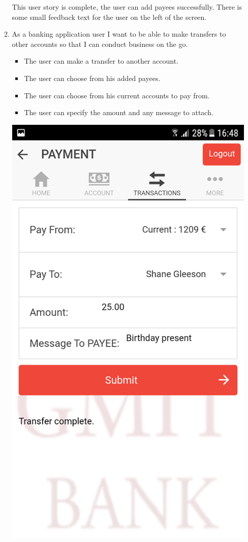 \begin{itemize}
\begin{enumerate}
\begin{center}
\end{center}
        This user story is complete, the user can add payees successfully. There is some small feedback text for the user on the left of the screen.
        \item As a banking application user I want to be able to make transfers to other accounts so that I can conduct business on the go.
            \begin{itemize}
                \item The user can make a transfer to another account.
                \item The user can choose from his added payees.
                \item The user can choose from his current accounts to pay from.
                \item The user can specify the amount and any message to attach.
            \end{itemize}
\begin{center}    
    \includegraphics[scale=0.5]{img/12transfercomplete.png}

\end{center}
\end{enumerate}
\end{itemize}
